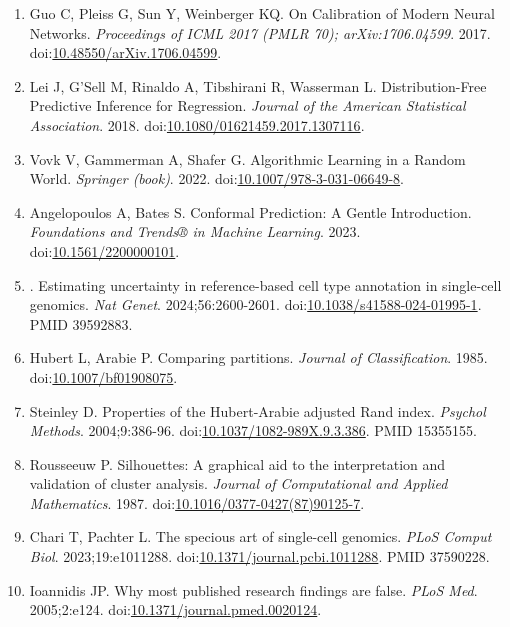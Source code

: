 \documentclass[11pt]{article}
\begin{document}
\begin{enumerate}
  PMID 33649592.
\item
  Guo C, Pleiss G, Sun Y, Weinberger KQ. On Calibration of Modern Neural
  Networks. \emph{Proceedings of ICML 2017 (PMLR 70); arXiv:1706.04599}.
  2017.
  doi:\href{https://doi.org/10.48550/arXiv.1706.04599}{10.48550/arXiv.1706.04599}.
\item
  Lei J, G'Sell M, Rinaldo A, Tibshirani R, Wasserman L.
  Distribution-Free Predictive Inference for Regression. \emph{Journal
  of the American Statistical Association}. 2018.
  doi:\href{https://doi.org/10.1080/01621459.2017.1307116}{10.1080/01621459.2017.1307116}.
\item
  Vovk V, Gammerman A, Shafer G. Algorithmic Learning in a Random World.
  \emph{Springer (book)}. 2022.
  doi:\href{https://doi.org/10.1007/978-3-031-06649-8}{10.1007/978-3-031-06649-8}.
\item
  Angelopoulos A, Bates S. Conformal Prediction: A Gentle Introduction.
  \emph{Foundations and Trends® in Machine Learning}. 2023.
  doi:\href{https://doi.org/10.1561/2200000101}{10.1561/2200000101}.
\item
  . Estimating uncertainty in reference-based cell type annotation in
  single-cell genomics. \emph{Nat Genet}. 2024;56:2600-2601.
  doi:\href{https://doi.org/10.1038/s41588-024-01995-1}{10.1038/s41588-024-01995-1}.
  PMID 39592883.
\item
  Hubert L, Arabie P. Comparing partitions. \emph{Journal of
  Classification}. 1985.
  doi:\href{https://doi.org/10.1007/bf01908075}{10.1007/bf01908075}.
\item
  Steinley D. Properties of the Hubert-Arabie adjusted Rand index.
  \emph{Psychol Methods}. 2004;9:386-96.
  doi:\href{https://doi.org/10.1037/1082-989X.9.3.386}{10.1037/1082-989X.9.3.386}.
  PMID 15355155.
\item
  Rousseeuw P. Silhouettes: A graphical aid to the interpretation and
  validation of cluster analysis. \emph{Journal of Computational and
  Applied Mathematics}. 1987.
  doi:\href{https://doi.org/10.1016/0377-0427(87)90125-7}{10.1016/0377-0427(87)90125-7}.
\item
  Chari T, Pachter L. The specious art of single-cell genomics.
  \emph{PLoS Comput Biol}. 2023;19:e1011288.
  doi:\href{https://doi.org/10.1371/journal.pcbi.1011288}{10.1371/journal.pcbi.1011288}.
  PMID 37590228.
\item
  Ioannidis JP. Why most published research findings are false.
  \emph{PLoS Med}. 2005;2:e124.
  doi:\href{https://doi.org/10.1371/journal.pmed.0020124}{10.1371/journal.pmed.0020124}.

\end{enumerate}
\end{document}
